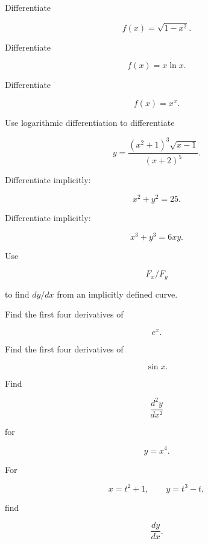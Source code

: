 \begin{exercise}[2]
Differentiate

\[
f(x)=\sqrt{1-x^2}.
\]
\end{exercise}

\begin{exercise}[2]
Differentiate

\[
f(x)=x\ln x.
\]
\end{exercise}

\begin{exercise}[2]
Differentiate

\[
f(x)=x^x.
\]
\end{exercise}

\begin{exercise}[3]
Use logarithmic differentiation to differentiate

\[
y
=
\frac{
(x^2+1)^3
\sqrt{x-1}
}{
(x+2)^5
}.
\]
\end{exercise}

\begin{exercise}[3]
Differentiate implicitly:

\[
x^2+y^2=25.
\]
\end{exercise}

\begin{exercise}[3]
Differentiate implicitly:

\[
x^3+y^3=6xy.
\]
\end{exercise}

\begin{exercise}[3]
Use

\[
F_x/F_y
\]

to find \(dy/dx\) from an implicitly defined curve.
\end{exercise}

\begin{exercise}[3]
Find the first four derivatives of

\[
e^x.
\]
\end{exercise}

\begin{exercise}[3]
Find the first four derivatives of

\[
\sin x.
\]
\end{exercise}

\begin{exercise}[3]
Find

\[
\frac{d^2y}{dx^2}
\]

for

\[
y=x^4.
\]
\end{exercise}

\begin{exercise}[3]
For

\[
x=t^2+1,
\qquad
y=t^3-t,
\]

find

\[
\frac{dy}{dx}.
\]
\end{exercise}

